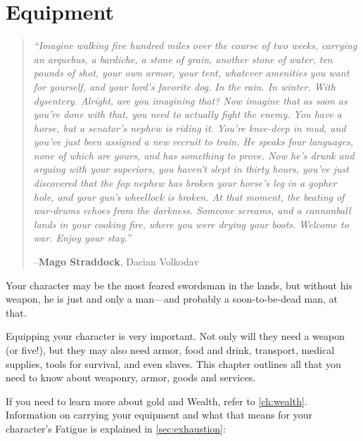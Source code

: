 \documentclass[oneside,11pt,english]{book}
\begin{document}
\chapter{Equipment}\label{ch:equipment}
\startcontents[chapters]
\clearpage
\begin{quotation}
	\raggedright
	\emph{“Imagine walking five hundred miles over the course of two weeks, carrying an arquebus, a bardiche, a stone of grain, another stone of water, ten pounds of shot, your own armor, your tent, whatever amenities you want for yourself, and your lord’s favorite dog. In the rain. In winter. With dysentery. Alright, are you imagining that? Now imagine that as soon as you’re done with that, you need to actually fight the enemy. You have a horse, but a senator’s nephew is riding it. You’re knee-deep in mud, and you’ve just been assigned a new recruit to train. He speaks four languages, none of which are yours, and has something to prove. Now he’s drunk and arguing with your superiors, you haven’t slept in thirty hours, you’ve just discovered that the fop nephew has broken your horse’s leg in a gopher hole, and your gun’s wheellock is broken. At that moment, the beating of war-drums echoes from the darkness. Someone screams, and a cannonball lands in your cooking fire, where you were drying your boots. Welcome to war. Enjoy your stay.”}

		\hfill--\textbf{Mago Straddock}, Dacian Volkodav
\end{quotation}
Your character may be the most feared swordsman in the lands, but without his weapon, he is just and 
only a man—and probably a soon-to-be-dead man, at that. 

Equipping your character is very important. Not only will they need a weapon (or five!), but they may 
also need armor, food and drink, transport, medical supplies, tools for survival, and even slaves. This 
chapter outlines all that you need to know about weaponry, armor, goods and services.

If you need to learn more about gold and Wealth, refer to \autoref{ch:wealth}. Information on carrying your equipment and what that means for your character’s Fatigue is explained in \autoref{sec:exhaustion}:~
\end{document}

